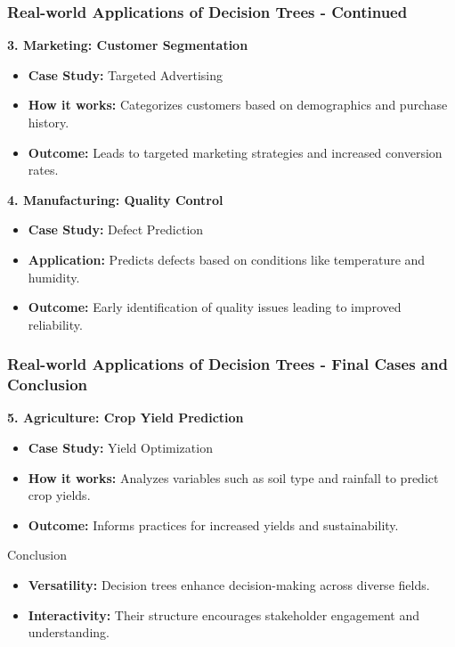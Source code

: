 \documentclass[aspectratio=169]{beamer}
\begin{document}
\begin{frame}[fragile]
    \frametitle{Real-world Applications of Decision Trees - Continued}
    
    \textbf{3. Marketing: Customer Segmentation}
    \begin{itemize}
        \item \textbf{Case Study:} Targeted Advertising
        \item \textbf{How it works:} Categorizes customers based on demographics and purchase history.
        \item \textbf{Outcome:} Leads to targeted marketing strategies and increased conversion rates.
    \end{itemize}
    
    \textbf{4. Manufacturing: Quality Control}
    \begin{itemize}
        \item \textbf{Case Study:} Defect Prediction
        \item \textbf{Application:} Predicts defects based on conditions like temperature and humidity.
        \item \textbf{Outcome:} Early identification of quality issues leading to improved reliability.
    \end{itemize}
\end{frame}

\begin{frame}[fragile]
    \frametitle{Real-world Applications of Decision Trees - Final Cases and Conclusion}
    
    \textbf{5. Agriculture: Crop Yield Prediction}
    \begin{itemize}
        \item \textbf{Case Study:} Yield Optimization
        \item \textbf{How it works:} Analyzes variables such as soil type and rainfall to predict crop yields.
        \item \textbf{Outcome:} Informs practices for increased yields and sustainability.
    \end{itemize}
    
    \begin{block}{Conclusion}
        \begin{itemize}
            \item \textbf{Versatility:} Decision trees enhance decision-making across diverse fields.
            \item \textbf{Interactivity:} Their structure encourages stakeholder engagement and understanding.
        \end{itemize}
    \end{block}
\end{frame}
\end{document}
